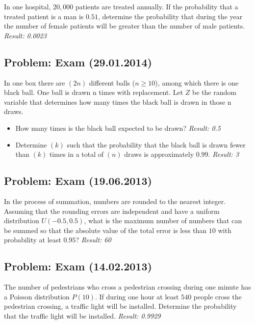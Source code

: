 \documentclass[a4paper, 12pt]{article}
\begin{document}
In one hospital, $20,000$ patients are treated annually. If the probability that a treated patient is a man is $0.51$, determine the probability that during the year the number of female patients will be greater than the number of male patients.
\textit{Result: {0.0023}}

\subsection{Problem: Exam (29.01.2014)}

In one box there are $(2n)$ different balls ($n \ge 10$), among which there is one black ball. One ball is drawn n times with replacement. Let $Z$ be the random variable that determines how many times the black ball is drawn in those n draws.
\begin{itemize}
  
\item [a)] How many times is the black ball expected to be drawn?
\textit{Result: {0.5}}

\item [b)] Determine $(k)$ such that the probability that the black ball is drawn fewer than $(k)$ times in a total of $(n)$ draws is approximately $0.99$.
\textit{Result: {3}}

\end{itemize}



\subsection{Problem: Exam (19.06.2013)}
In the process of summation, numbers are rounded to the nearest integer. Assuming that the rounding errors are independent and have a uniform distribution $U(-0.5, 0.5)$, what is the maximum number of numbers that can be summed so that the absolute value of the total error is less than $10$ with probability at least $0.95$?
\textit{Result: {60}}

\subsection{Problem: Exam (14.02.2013)}
The number of pedestrians who cross a pedestrian crossing during one minute has a Poisson distribution $P(10)$. If during one hour at least $540$ people cross the pedestrian crossing, a traffic light will be installed. Determine the probability that the traffic light will be installed.
\textit{Result: {0.9929}}
\end{document}
